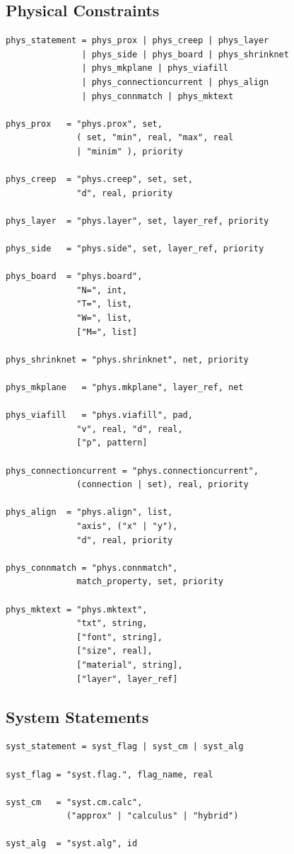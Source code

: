 \documentclass{report}
\begin{document}
\subsection{Physical Constraints}
\begin{verbatim}
phys_statement = phys_prox | phys_creep | phys_layer
               | phys_side | phys_board | phys_shrinknet
               | phys_mkplane | phys_viafill
               | phys_connectioncurrent | phys_align
               | phys_connmatch | phys_mktext

phys_prox   = "phys.prox", set,
              ( set, "min", real, "max", real
              | "minim" ), priority

phys_creep  = "phys.creep", set, set,
              "d", real, priority

phys_layer  = "phys.layer", set, layer_ref, priority

phys_side   = "phys.side", set, layer_ref, priority

phys_board  = "phys.board",
              "N=", int,
              "T=", list,
              "W=", list,
              ["M=", list]

phys_shrinknet = "phys.shrinknet", net, priority

phys_mkplane   = "phys.mkplane", layer_ref, net

phys_viafill   = "phys.viafill", pad,
              "v", real, "d", real,
              ["p", pattern]

phys_connectioncurrent = "phys.connectioncurrent",
              (connection | set), real, priority

phys_align  = "phys.align", list,
              "axis", ("x" | "y"),
              "d", real, priority

phys_connmatch = "phys.connmatch",
              match_property, set, priority

phys_mktext = "phys.mktext",
              "txt", string,
              ["font", string],
              ["size", real],
              ["material", string],
              ["layer", layer_ref]
\end{verbatim}

\subsection{System Statements}
\begin{verbatim}
syst_statement = syst_flag | syst_cm | syst_alg

syst_flag = "syst.flag.", flag_name, real

syst_cm   = "syst.cm.calc",
            ("approx" | "calculus" | "hybrid")

syst_alg  = "syst.alg", id
\end{verbatim}
\end{document}

